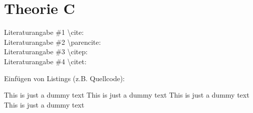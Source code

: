 \section{Theorie C}
\label{sec:theorieC}

Literaturangabe \#1 \textbackslash cite: \cite{max2007company} \\
Literaturangabe \#2 \textbackslash parencite: \parencite{example2017sdk} \\
Literaturangabe \#3 \textbackslash citep: \citep{place2014art} \\
Literaturangabe \#4 \textbackslash citet: \citet{max2007company}

\bigskip

Einfügen von Listings (z.B. Quellcode):

\begin{center}
	\begin{minipage}[!H]{\textwidth}
		
	\end{minipage}
\end{center}

This is just a dummy text This is just a dummy text  This is just a dummy text This is just a dummy text 

\begin{center}
	\begin{minipage}[!H]{\textwidth}
		
	\end{minipage}
\end{center}